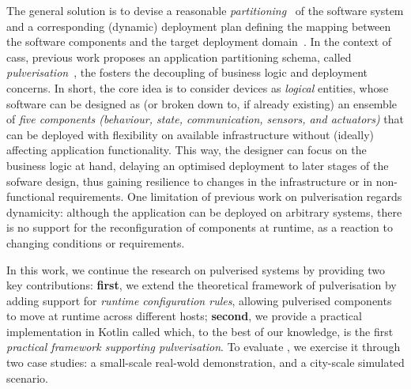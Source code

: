 \documentclass[conference]{IEEEtran}
\newcommand{\meta}[1]{{\color{blue}#1}}
\begin{document}
The general solution is to devise 
 a reasonable \emph{partitioning}~\cite{DBLP:journals/jnca/LiuASGBQ15} of the software system
 and a corresponding (dynamic) deployment plan 
 defining the mapping between the software components and the target deployment domain~\cite{DBLP:journals/jss/ArcangeliBL15}.
%
In the context of \acp{cas},
 previous work proposes an application partitioning schema,
 called \emph{pulverisation}~\cite{FI2020-pulverization},
 the fosters the decoupling of business logic and deployment concerns.
%
In short, the core idea is to consider devices as \emph{logical} entities,
whose software can be designed as (or broken down to, if already existing) an ensemble of \emph{five components
(behaviour, state, communication, sensors, and actuators)}
 that can be deployed with flexibility on available infrastructure without (ideally) affecting application functionality. %
%
This way, the designer can focus on the business logic at hand,
delaying an optimised deployment to later stages of the sofware design,
thus gaining resilience to changes in the infrastructure or in non-functional requirements.
%
One limitation of previous work on pulverisation regards dynamicity:
although the application can be deployed on arbitrary systems,
there is no support for the reconfiguration of components at runtime, as a reaction to changing conditions or requirements.

In this work,
we continue the research on pulverised systems by providing two key contributions:
\textbf{first}, we extend the theoretical framework of pulverisation by adding support for
\emph{runtime configuration rules}, allowing pulverised components to move at runtime across different hosts;
\textbf{second}, we provide a practical implementation in Kotlin called \emph{\ourframework{}} which,
to the best of our knowledge,
is the first \emph{practical framework supporting pulverisation}. %
%
To evaluate \ourframework{}, we exercise it through two case studies:
a small-scale real-wold demonstration, and a city-scale simulated scenario.

\end{document}
